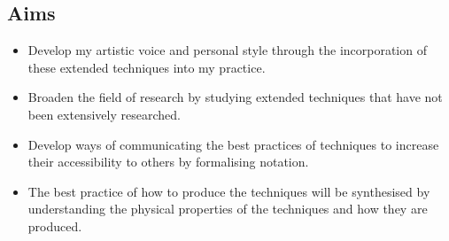 

\subsection{Aims}
\begin{itemize}
   \item Develop my artistic voice and personal style through the incorporation of these extended techniques into my practice.
   \item Broaden the field of research by studying extended techniques that have not been extensively researched.
   \item Develop ways of communicating the best practices of techniques to increase their accessibility to others by formalising notation.
   \item The best practice of how to produce the techniques will be synthesised by understanding the physical properties of the techniques and how they are produced. 
\end{itemize}





